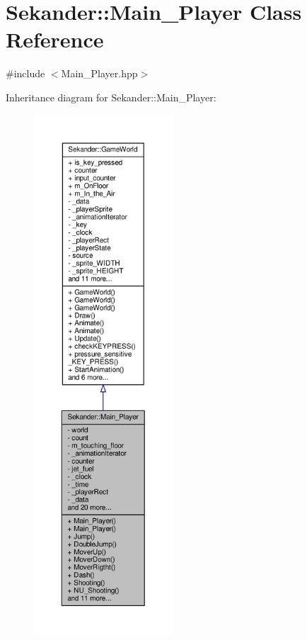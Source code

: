 \hypertarget{classSekander_1_1Main__Player}{}\section{Sekander\+:\+:Main\+\_\+\+Player Class Reference}
\label{classSekander_1_1Main__Player}


{\ttfamily \#include $<$Main\+\_\+\+Player.\+hpp$>$}



Inheritance diagram for Sekander\+:\+:Main\+\_\+\+Player\+:
\nopagebreak
\begin{figure}[H]
\begin{center}
\leavevmode
\includegraphics[height=550pt]{classSekander_1_1Main__Player__inherit__graph}
\end{center}
\end{figure}


